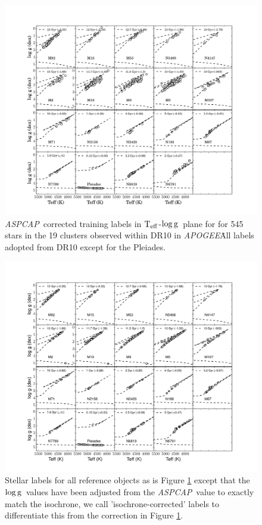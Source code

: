 \documentclass[12pt, preprint]{aastex}
\newcommand{\teff}{\mbox{$\rm T_{eff}$}}
\newcommand{\logg}{\mbox{$\rm \log g$}}
\newcommand{\apogee}{\textsl{APOGEE}}
\newcommand{\aspcap}{\textsl{ASPCAP}}
\begin{document}
\begin{figure}[h!]
\centering
    \includegraphics[scale=0.33]{./plots/training_aspcap.pdf}
\caption{\aspcap\ corrected training labels in \teff-\logg\ plane for for 545 stars in the 19 clusters observed within DR10 in \apogee\. All labels adopted from DR10 except for the Pleiades. }
\label{fig:trainingaspcap}
\end{figure}

\begin{figure}[h!]
\centering
  \includegraphics[scale=0.33]{./plots/training_mkn2.pdf}
\caption{Stellar labels for all reference objects as is Figure \ref{fig:trainingaspcap} except that the \logg\ values have been adjusted from the \aspcap\ value to exactly match the isochrone, we call  'isochrone-corrected' labels to differentiate this from the correction in Figure \ref{fig:trainingaspcap}.  }
\label{fig:trainingisochrone}
\end{figure}
\end{document}
